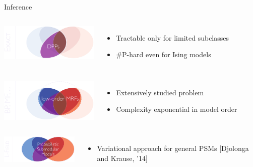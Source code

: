 \documentclass[mathserif]{beamer}
\newcommand{\qcite}[1]{{\scriptsize\color{col2}[#1]}}
\begin{document}
\begin{frame}{Inference}
\vspace{1em}

\begin{minipage}{\textwidth}
\begin{columns}[c]
\includegraphics[width=1.85in]{figures/inf01_exact_horz.pdf}
\begin{itemize}
\item \small{Tractable only for limited subclasses}
\vspace{1em}
\item \#P-hard even for Ising models
\end{itemize}
\end{columns}
\end{minipage}

\vspace{2em}
\begin{minipage}{\textwidth}
\begin{columns}[c]
\includegraphics[width=1.85in]{figures/inf02_loworder_horz.pdf}
\begin{itemize}
\item \small{Extensively studied problem}
\vspace{1em}
\item \small{Complexity exponential in model order}
\end{itemize}
\end{columns}
\end{minipage}

\vspace{2em}
\begin{minipage}{\textwidth}
\begin{columns}[c]
\includegraphics[width=1.85in]{figures/inf03_psm_horz.pdf}
\begin{itemize}
\item Variational approach for general PSMs \qcite{Djolonga and Krause, '14}
\end{itemize}
\end{columns}
\end{minipage}
\end{frame}
\end{document}
